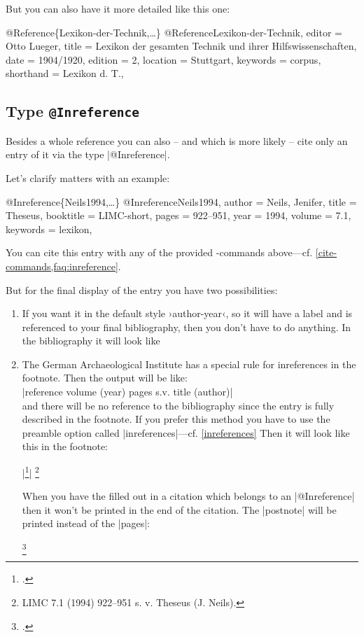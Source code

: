 \documentclass[a4paper,
10pt,
greek,
french,
spanish,
italian,
ngerman,
english
]{ltxdoc}
\begin{document}
But you can also have it  more detailed  like this one:
\begin{bibexample}[label=Lexikon-der-Technik]{{@}Reference\{Lexikon-der-Technik,…\}}
@Reference{Lexikon-der-Technik,
  editor    = {Otto Lueger},
  title     = {Lexikon der gesamten Technik und ihrer Hilfswissenschaften},
  date      = {1904/1920},
  edition   = {2},
  location  = Stuttgart,   %
  keywords  = {corpus},
  shorthand = {Lexikon d. T.},
}
\end{bibexample}

 \subsection{Type \texttt{@Inreference}}\label{inreference}
Besides a whole reference you can also -- and which is more likely -- cite only an entry of it via the type  |@Inreference|.

Let’s clarify matters with an example:
\begin{bibexample}[label=Neils1994]{{@}Inreference\{Neils1994,…\}}
@Inreference{Neils1994,
  author    = {Neils, Jenifer},
  title     = {Theseus},
  booktitle = LIMC-short,    %
  pages     = {922--951},
  year      = {1994},
  volume    = {7.1},
  keywords  = {lexikon},
}
\end{bibexample}
You can cite this entry with any of the provided -commands above---cf. \cref{cite-commands,faq:inreference}.

But for the final display of the entry  you have two possibilities:
 \begin{enumerate}
\item\label{inreference:a} 

If you want it in the default style ›author-year‹, so it will have a label and is referenced 
to your final bibliography, then you don’t have to do anything.
In the bibliography it will look like

\item\label{inreference:b} 
The German Archaeological Institute has a special rule for inreferences in the footnote.
Then the output will be like:\\
|reference volume (year) pages s.v. title (author)| \\
and there will be no reference to the bibliography since the entry is fully described in the footnote.
 If you prefer this method you have to use the preamble option called  |inreferences|---cf. \cref{inreferences}
Then it will look like this in the footnote:
\begin{examplebox}
|\footnote{\cite{Neils1994}.}|
\tcblower
\footnote{LIMC 7.1 (1994) 922--951 s. v. Theseus (J. Neils).}
\end{examplebox}
When you have the  filled out in a citation which belongs to an |@Inreference| then it won’t be printed in the end of the citation.
The |postnote|  will be printed instead of the |pages|:
\begin{example}
\footnote{\cite[vgl.][930 Nr. 283]{Neils1994}.}
\end{example} 
\end{enumerate}
\end{document}
